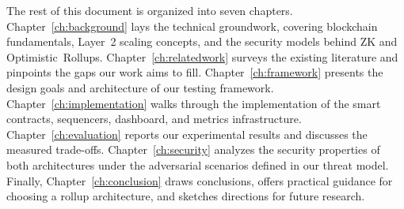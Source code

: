 The rest of this document is organized into seven chapters. Chapter~\ref{ch:background} lays the technical groundwork, covering blockchain fundamentals, Layer~2 scaling concepts, and the security models behind ZK and Optimistic~Rollups. Chapter~\ref{ch:relatedwork} surveys the existing literature and pinpoints the gaps our work aims to fill. Chapter~\ref{ch:framework} presents the design goals and architecture of our testing framework. Chapter~\ref{ch:implementation} walks through the implementation of the smart contracts, sequencers, dashboard, and metrics infrastructure. Chapter~\ref{ch:evaluation} reports our experimental results and discusses the measured trade-offs. Chapter~\ref{ch:security} analyzes the security properties of both architectures under the adversarial scenarios defined in our threat model. Finally, Chapter~\ref{ch:conclusion} draws conclusions, offers practical guidance for choosing a rollup architecture, and sketches directions for future research.
